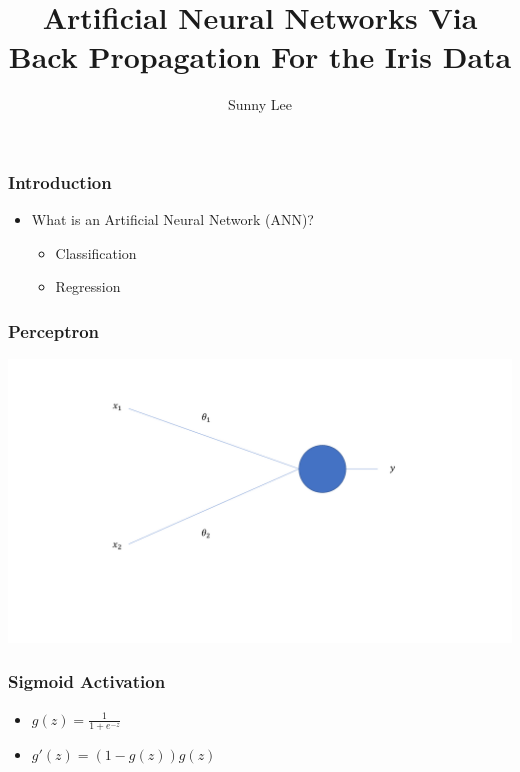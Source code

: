 \documentclass{beamer}
\title{Artificial Neural Networks Via Back Propagation For the Iris Data}
\author{Sunny Lee}
\begin{document}
\frame{

	\titlepage
}

\begin{frame}
    \frametitle{Introduction}
    \begin{itemize}[<+->]
        \item What is an Artificial Neural Network (ANN)? 
        \begin{itemize}
            \item Classification
            \item Regression
        \end{itemize}
    \end{itemize}
\end{frame}

\begin{frame}
    \frametitle{Perceptron}

        \centerline{\includegraphics[scale = .3]{perceptron.pdf}}
    
\end{frame}

\begin{frame}
    \frametitle{Sigmoid Activation}

        \begin{itemize}[<+->]
            \item $g(z) = \frac{1}{1+e^{-z}}$
            \item $g'(z) = (1-g(z))g(z)$
        \end{itemize}
    
\end{frame}
\end{document}
